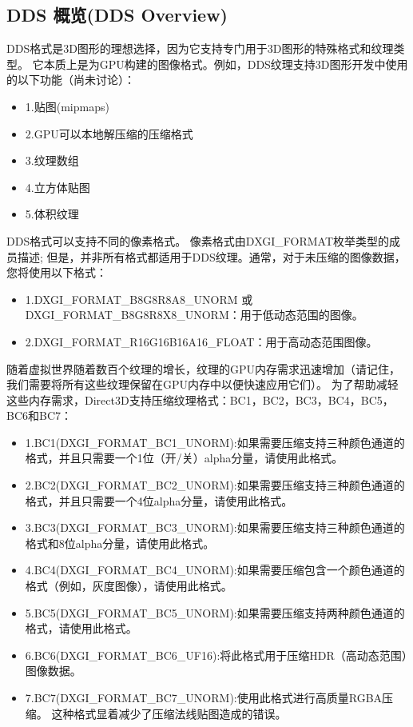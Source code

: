 \subsection{DDS 概览(DDS Overview)}
\begin{flushleft}
DDS格式是3D图形的理想选择，因为它支持专门用于3D图形的特殊格式和纹理类型。 它本质上是为GPU构建的图像格式。例如，DDS纹理支持3D图形开发中使用的以下功能（尚未讨论）：\\
\end{flushleft}

\begin{itemize} 
  \item 1.贴图(mipmaps)
  \item 2.GPU可以本地解压缩的压缩格式
  \item 3.纹理数组
  \item 4.立方体贴图
  \item 5.体积纹理
\end{itemize}

\begin{flushleft}
DDS格式可以支持不同的像素格式。 像素格式由DXGI\_FORMAT枚举类型的成员描述; 但是，并非所有格式都适用于DDS纹理。通常，对于未压缩的图像数据，您将使用以下格式：\\
\end{flushleft}

\begin{itemize} 
  \item 1.DXGI\_FORMAT\_B8G8R8A8\_UNORM 或 DXGI\_FORMAT\_B8G8R8X8\_UNORM：用于低动态范围的图像。
  \item 2.DXGI\_FORMAT\_R16G16B16A16\_FLOAT：用于高动态范围图像。
\end{itemize}

\begin{flushleft}
随着虚拟世界随着数百个纹理的增长，纹理的GPU内存需求迅速增加（请记住，我们需要将所有这些纹理保留在GPU内存中以便快速应用它们）。 为了帮助减轻这些内存需求，Direct3D支持压缩纹理格式：BC1，BC2，BC3，BC4，BC5，BC6和BC7：\\
\end{flushleft}

\begin{itemize} 
  \item 1.BC1(DXGI_FORMAT_BC1_UNORM):如果需要压缩支持三种颜色通道的格式，并且只需要一个1位（开/关）alpha分量，请使用此格式。
  \item 2.BC2(DXGI_FORMAT_BC2_UNORM):如果需要压缩支持三种颜色通道的格式，并且只需要一个4位alpha分量，请使用此格式。
  \item 3.BC3(DXGI_FORMAT_BC3_UNORM):如果需要压缩支持三种颜色通道的格式和8位alpha分量，请使用此格式。
  \item 4.BC4(DXGI_FORMAT_BC4_UNORM):如果需要压缩包含一个颜色通道的格式（例如，灰度图像），请使用此格式。
  \item 5.BC5(DXGI_FORMAT_BC5_UNORM):如果需要压缩支持两种颜色通道的格式，请使用此格式。
  \item 6.BC6(DXGI_FORMAT_BC6_UF16):将此格式用于压缩HDR（高动态范围）图像数据。
  \item 7.BC7(DXGI_FORMAT_BC7_UNORM):使用此格式进行高质量RGBA压缩。 这种格式显着减少了压缩法线贴图造成的错误。
\end{itemize}

